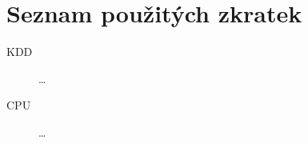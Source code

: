 \documentclass[thesis=M,czech]{FITthesis}[2012/06/26]
\begin{document}



\appendix

\chapter{Seznam použitých zkratek}
\begin{description}
	\item[KDD] \dots
	\item[CPU] \dots
\end{description}


% 
% 
% 
% 
% 
\end{document}
